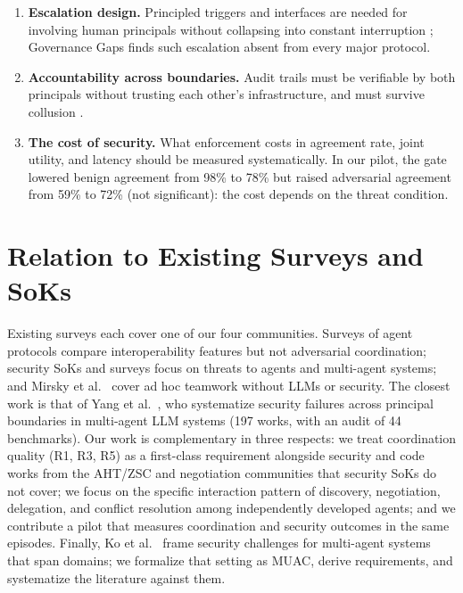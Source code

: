 \documentclass[conference]{IEEEtran}
\begin{document}
\begin{enumerate}
\item
  \textbf{Escalation design.} Principled triggers and interfaces are needed for involving human principals without collapsing into constant interruption \cite{wu2026permissions}; Governance Gaps finds such escalation absent from every major protocol.
\item
  \textbf{Accountability across boundaries.} Audit trails must be verifiable by both principals without trusting each other's infrastructure, and must survive collusion \cite{motwani2024collusion}.
\item
  \textbf{The cost of security.} What enforcement costs in agreement rate, joint utility, and latency should be measured systematically. In our pilot, the gate lowered benign agreement from 98\% to 78\% but raised adversarial agreement from 59\% to 72\% (not significant): the cost depends on the threat condition.
\end{enumerate}

\section{Relation to Existing Surveys and SoKs}\label{sec-10}

Existing surveys each cover one of our four communities. Surveys of agent protocols \cite{ehtesham2025survey, sander2026taxonomy} compare interoperability features but not adversarial coordination; security SoKs and surveys \cite{kim2026sokagentic, raza2025trism, mostafavi2026trustworthy} focus on threats to agents and multi-agent systems; and Mirsky et al.~\cite{mirsky2022survey} cover ad hoc teamwork without LLMs or security. The closest work is that of Yang et al.~\cite{yang2026soksafeagents}, who systematize security failures across principal boundaries in multi-agent LLM systems (197 works, with an audit of 44 benchmarks). Our work is complementary in three respects: we treat coordination quality (R1, R3, R5) as a first-class requirement alongside security and code works from the AHT/ZSC and negotiation communities that security SoKs do not cover; we focus on the specific interaction pattern of discovery, negotiation, delegation, and conflict resolution among independently developed agents; and we contribute a pilot that measures coordination and security outcomes in the same episodes. Finally, Ko et al.~\cite{ko2026sevenchallenges} frame security challenges for multi-agent systems that span domains; we formalize that setting as MUAC, derive requirements, and systematize the literature against them.
\end{document}
